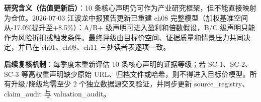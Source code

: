 \vspace{0.4em}
\noindent\textbf{研究含义（估值更新后）}：10 条核心声明仍可作为产业研究框架，但不能直接映射为仓位。2026-07-03 江波龙中报预告更新已重建 ch08 完整模型（加权基准空间从-17.0\%提升至+8.5\%）：A/B+ 级声明可进入盈利和倍数假设，B/C 级声明只能作为风险折扣或触发条件。最终评级由目标价空间、证据质量和情景压力共同决定，并已在 ch01、ch08、ch11 三处读者表逐项一致。\par
\textbf{后续复核机制}：每季度末重新评估 10 条核心声明的证据等级；若 SC-1、SC-2、SC-3 等高权重声明缺少原始 URL、归档文件或哈希，则不得进入目标价模型。所有升级/降级均需至少 2 个独立数据源交叉验证，并同步更新 source\_registry、claim\_audit 与 valuation\_audit。
